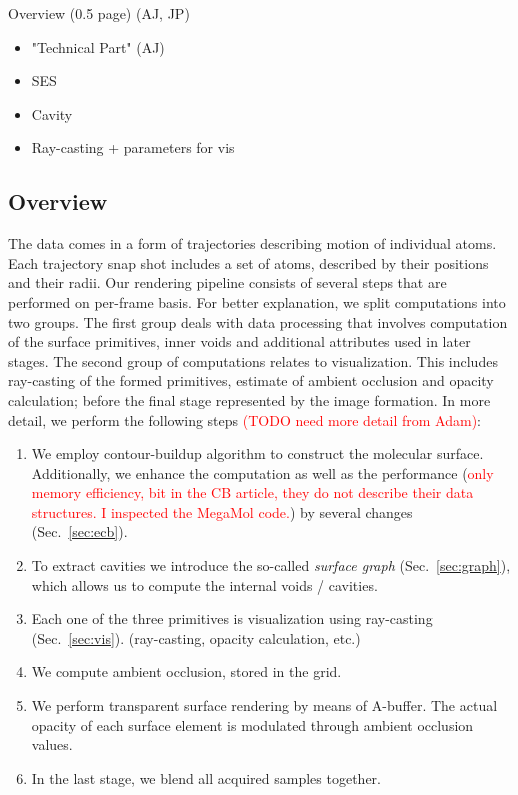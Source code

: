 Overview (0.5 page) (AJ, JP)
\begin{itemize}
  \item "Technical Part" (AJ)
  \item SES
  \item Cavity
  \item Ray-casting + parameters for vis
\end{itemize}

\subsection{Overview}

The data comes in a form of trajectories describing motion of individual atoms. Each trajectory snap shot includes a set of atoms, described by their positions and their radii. Our rendering pipeline consists of several steps that are performed on per-frame basis. 
For better explanation, we split computations into two groups. The first group deals with data processing that involves computation of the surface primitives, inner voids and additional attributes used in later stages. The second group of computations relates to visualization. This includes ray-casting of the formed primitives, estimate of ambient occlusion and opacity calculation; before the final stage represented by the image formation. In more detail, we perform the following steps \textcolor{red}{(TODO need more detail from Adam)}:
	\begin{enumerate}
	  \item We employ contour-buildup algorithm to construct the molecular surface. Additionally, we enhance the computation as well as the performance (\textcolor{red}{only memory efficiency, bit in the CB article, they do not describe their data structures. I inspected the MegaMol code.}) by several changes (Sec.~\ref{sec:ecb}).
		\item To extract cavities we introduce the so-called \textit{surface graph} (Sec.~\ref{sec:graph}), which allows us to compute the internal voids / cavities.
		\item Each one of the three primitives is visualization using ray-casting (Sec.~\ref{sec:vis}). (ray-casting, opacity calculation, etc.)
		\item We compute ambient occlusion, stored in the grid.
		\item We perform transparent surface rendering by means of A-buffer. The actual opacity of each surface element is modulated through ambient occlusion values.
		\item In the last stage, we blend all acquired samples together.
	\end{enumerate}

